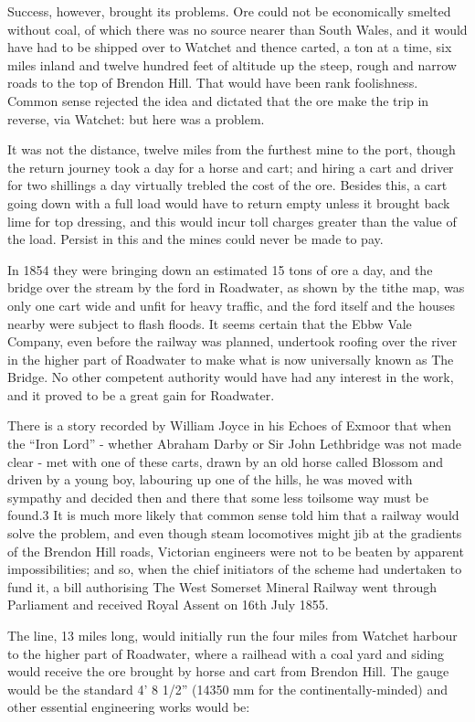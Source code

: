 \documentclass[10pt,a4paper]{article}
\begin{document}
Success, however, brought its problems. Ore could not be economically smelted without coal, of which there was no source nearer than South Wales, and it would have had to be shipped over to Watchet and thence carted, a ton at a time, six miles inland  and  twelve hundred feet of altitude up the steep, rough and narrow roads to the top of Brendon Hill. That would have been rank foolishness. Common sense rejected the idea and dictated that the ore make the trip in reverse, via Watchet: but here was a problem.

It was not the distance, twelve miles from the furthest mine to the port, though the return journey took a day for a horse and cart; and hiring a cart and driver for two shillings a day virtually trebled the cost of the ore. Besides this, a cart going down with a full load would have to return empty unless it brought back lime for top dressing, and this would incur toll charges greater than the value of the load. Persist in this and the mines could never be made to pay.

In 1854 they were bringing down an estimated 15 tons of ore a day, and the bridge over the stream by the ford in Roadwater, as shown by the tithe map, was only one cart wide and unfit for heavy traffic, and the ford itself and the houses nearby were subject to flash floods. It seems certain that the Ebbw Vale Company,   even before the railway was planned, undertook roofing  over the river in the higher part of Roadwater to make what is now universally known as The Bridge. No other competent authority would have had any interest in the work, and it proved to be a great gain for Roadwater.

There is a story recorded by William Joyce in his Echoes of Exmoor  that when the “Iron Lord” - whether Abraham Darby or Sir John Lethbridge was not made clear -  met with one of these carts, drawn by an old horse called Blossom and driven by a young boy, labouring up one of the hills, he was moved with sympathy and decided then and there that some less toilsome way must be found.3  It is much more likely that common sense told him that a railway would solve the problem, and even though steam locomotives might jib at the gradients of the Brendon Hill roads, Victorian engineers were not to be beaten by apparent impossibilities; and so, when the chief initiators of the scheme had undertaken to fund it, a bill authorising The West Somerset Mineral Railway went through Parliament and received Royal Assent on 16th July 1855.

The line, 13 miles long, would initially run the four miles from Watchet harbour to the higher part of Roadwater, where a railhead with a coal yard and siding would receive the ore brought by horse and cart from Brendon Hill. The gauge would be the standard 4’ 8 1/2” (14350 mm for the continentally-minded) and other essential engineering works would be:
\end{document}
